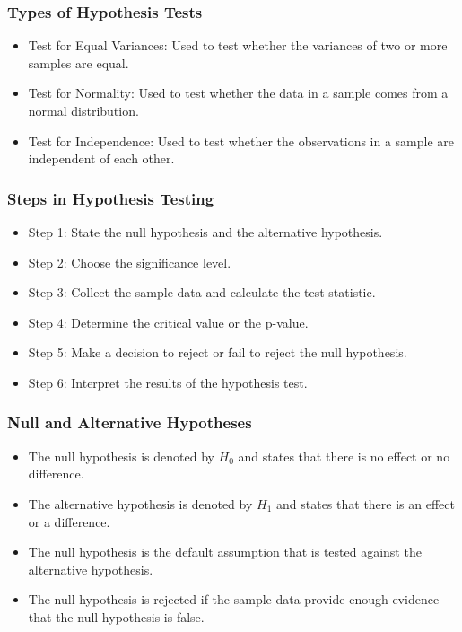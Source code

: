 \documentclass[serif, 9pt, aspectratio=32]{beamer}
\begin{document}
\begin{frame}
    \frametitle{Types of Hypothesis Tests}
    \begin{itemize}
        \setlength{\itemsep}{2em}
        \item Test for Equal Variances: Used to test whether the variances of two or more samples are equal.
        \item Test for Normality: Used to test whether the data in a sample comes from a normal distribution.
        \item Test for Independence: Used to test whether the observations in a sample are independent of each other.
    \end{itemize}
\end{frame}

\begin{frame}
    \frametitle{Steps in Hypothesis Testing}
    \begin{itemize}
        \setlength{\itemsep}{2em}
        \item Step 1: State the null hypothesis and the alternative hypothesis.
        \item Step 2: Choose the significance level.
        \item Step 3: Collect the sample data and calculate the test statistic.
        \item Step 4: Determine the critical value or the p-value.
        \item Step 5: Make a decision to reject or fail to reject the null hypothesis.
        \item Step 6: Interpret the results of the hypothesis test.
    \end{itemize}
\end{frame}

\begin{frame}
    \frametitle{Null and Alternative Hypotheses}
    \begin{itemize}
        \setlength{\itemsep}{2em}
        \item The null hypothesis is denoted by $H_0$ and states that there is no effect or no difference.
        \item The alternative hypothesis is denoted by $H_1$ and states that there is an effect or a difference.
        \item The null hypothesis is the default assumption that is tested against the alternative hypothesis.
        \item The null hypothesis is rejected if the sample data provide enough evidence that the null hypothesis is false.
    \end{itemize}
\end{frame}
\end{document}
